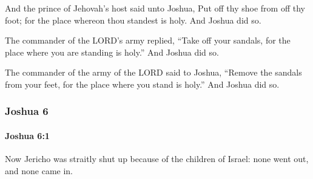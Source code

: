 			\begin{versebox}
					\item[BHS] 
					\item[ASV] And the prince of Jehovah's host said unto Joshua, Put off thy shoe from off thy foot; for the place whereon thou standest is holy. And Joshua did so.
					\item[NIV] The commander of the LORD’s army replied, “Take off your sandals, for the place where you are standing is holy.” And Joshua did so.
					\item[NRSV] The commander of the army of the LORD said to Joshua, “Remove the sandals from your feet, for the place where you stand is holy.” And Joshua did so.
			\end{versebox}
	\subsubsection{Joshua 6} %
		\label{JOSHUA-6}

		\paragraph{Joshua 6:1} %
			\label{JOSHUA-6-1}

			Now Jericho was straitly shut up because of the children of Israel: none went out, and none came in.

